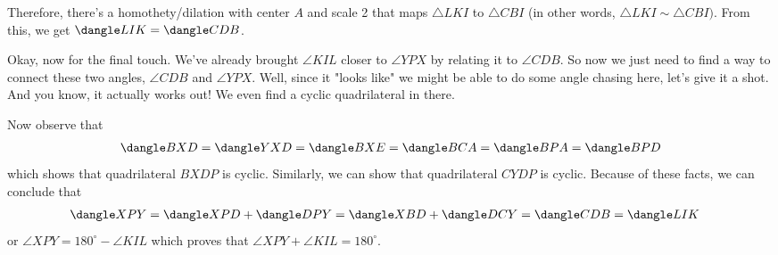 Therefore, there's a homothety/dilation with center $A$ and scale 2 that maps $\triangle LKI$ to $\triangle CBI$ (in other words, $\triangle LKI \sim \triangle CBI)$. From this, we get $\dangle LIK = \dangle CDB$. 
\begin{comment*}
    Okay, now for the final touch. We've already brought $\angle KIL$ closer to $\angle YPX$ by relating it to $\angle CDB$. So now we just need to find a way to connect these two angles, $\angle CDB$ and $\angle YPX$. Well, since it "looks like" we might be able to do some angle chasing here, let's give it a shot. And you know, it actually works out! We even find a cyclic quadrilateral in there.
\end{comment*}
Now observe that
\begin{align*}
    \dangle BXD = \dangle YXD = \dangle BXE = \dangle BCA = \dangle BPA = \dangle BPD
\end{align*}
which shows that quadrilateral $BXDP$ is cyclic. Similarly, we can show that quadrilateral $CYDP$ is cyclic. Because of these facts, we can conclude that
\begin{align*}
    \dangle XPY &= \dangle XPD + \dangle DPY = \dangle XBD +\dangle DCY = \dangle CDB = \dangle LIK
\end{align*}
or $\angle XPY = 180^\circ - \angle KIL$ which proves that $\angle XPY + \angle KIL = 180^\circ$.
